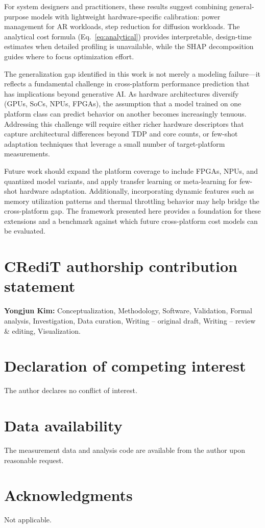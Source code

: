 \documentclass[review,12pt,authoryear]{elsarticle}
\begin{document}
For system designers and practitioners, these results suggest combining general-purpose models with lightweight hardware-specific calibration: power management for AR workloads, step reduction for diffusion workloads.
The analytical cost formula (Eq.~\ref{eq:analytical}) provides interpretable, design-time estimates when detailed profiling is unavailable, while the SHAP decomposition guides where to focus optimization effort.

The generalization gap identified in this work is not merely a modeling failure---it reflects a fundamental challenge in cross-platform performance prediction that has implications beyond generative AI.
As hardware architectures diversify (GPUs, SoCs, NPUs, FPGAs), the assumption that a model trained on one platform class can predict behavior on another becomes increasingly tenuous.
Addressing this challenge will require either richer hardware descriptors that capture architectural differences beyond TDP and core counts, or few-shot adaptation techniques that leverage a small number of target-platform measurements.

Future work should expand the platform coverage to include FPGAs, NPUs, and quantized model variants, and apply transfer learning or meta-learning for few-shot hardware adaptation.
Additionally, incorporating dynamic features such as memory utilization patterns and thermal throttling behavior may help bridge the cross-platform gap.
The framework presented here provides a foundation for these extensions and a benchmark against which future cross-platform cost models can be evaluated.



\section*{CRediT authorship contribution statement}

\textbf{Yongjun Kim:} Conceptualization, Methodology, Software, Validation, Formal analysis, Investigation, Data curation, Writing -- original draft, Writing -- review \& editing, Visualization.

\section*{Declaration of competing interest}

The author declares no conflict of interest.

\section*{Data availability}

The measurement data and analysis code are available from the author upon reasonable request.

\section*{Acknowledgments}

Not applicable.



\end{document}

